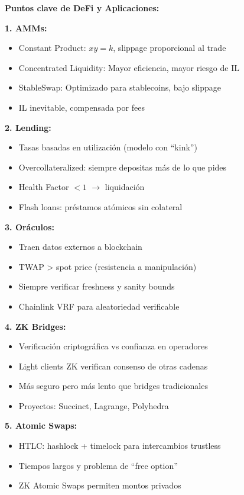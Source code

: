\documentclass[11pt,a4paper,twoside]{book}
\begin{document}
\begin{keyidea}
\textbf{Puntos clave de DeFi y Aplicaciones:}

\textbf{1. AMMs:}
\begin{itemize}
    \item Constant Product: $xy = k$, slippage proporcional al trade
    \item Concentrated Liquidity: Mayor eficiencia, mayor riesgo de IL
    \item StableSwap: Optimizado para stablecoins, bajo slippage
    \item IL inevitable, compensada por fees
\end{itemize}

\textbf{2. Lending:}
\begin{itemize}
    \item Tasas basadas en utilizaci\'on (modelo con ``kink'')
    \item Overcollateralized: siempre depositas m\'as de lo que pides
    \item Health Factor $< 1$ $\to$ liquidaci\'on
    \item Flash loans: pr\'estamos at\'omicos sin colateral
\end{itemize}

\textbf{3. Or\'aculos:}
\begin{itemize}
    \item Traen datos externos a blockchain
    \item TWAP > spot price (resistencia a manipulaci\'on)
    \item Siempre verificar freshness y sanity bounds
    \item Chainlink VRF para aleatoriedad verificable
\end{itemize}

\textbf{4. ZK Bridges:}
\begin{itemize}
    \item Verificaci\'on criptogr\'afica vs confianza en operadores
    \item Light clients ZK verifican consenso de otras cadenas
    \item M\'as seguro pero m\'as lento que bridges tradicionales
    \item Proyectos: Succinct, Lagrange, Polyhedra
\end{itemize}

\textbf{5. Atomic Swaps:}
\begin{itemize}
    \item HTLC: hashlock + timelock para intercambios trustless
    \item Tiempos largos y problema de ``free option''
    \item ZK Atomic Swaps permiten montos privados
\end{itemize}


\end{keyidea}
\end{document}
